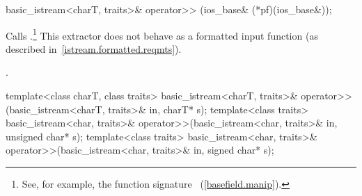 %
%
\begin{itemdecl}
basic_istream<charT, traits>& operator>>
    (ios_base& (*pf)(ios_base&));
\end{itemdecl}

\begin{itemdescr}
\pnum
\effects
Calls
.\footnote{See, for example, the function signature
~(\ref{basefield.manip}).}
This extractor does not behave as a formatted input function
(as described in~\ref{istream.formatted.reqmts}).

\pnum
\returns
{}.
\end{itemdescr}

%
%
\begin{itemdecl}
template<class charT, class traits>
  basic_istream<charT, traits>& operator>>(basic_istream<charT, traits>& in,
                                           charT* s);
template<class traits>
  basic_istream<char, traits>& operator>>(basic_istream<char, traits>& in,
                                          unsigned char* s);
template<class traits>
  basic_istream<char, traits>& operator>>(basic_istream<char, traits>& in,
                                          signed char* s);
\end{itemdecl}

